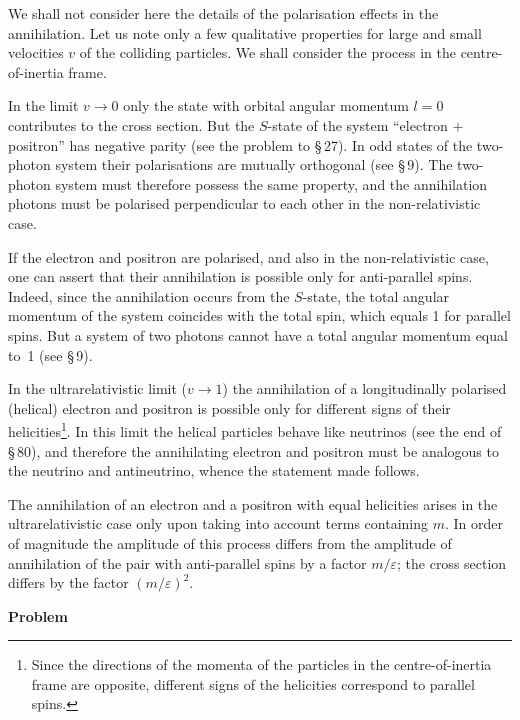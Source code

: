 We shall not consider here the details of the polarisation effects in the annihilation. Let us note only a few qualitative properties for large and small velocities $v$ of the colliding particles. We shall consider the process in the centre-of-inertia frame.

In the limit $v \to 0$ only the state with orbital angular momentum $l = 0$ contributes to the cross section. But the $S$-state of the system ``electron $+$ positron'' has negative parity (see the problem to \S\,27). In odd states of the two-photon system their polarisations are mutually orthogonal (see \S\,9). The two-photon system must therefore possess the same property, and the annihilation photons must be polarised perpendicular to each other in the non-relativistic case.

If the electron and positron are polarised, and also in the non-relativistic case, one can assert that their annihilation is possible only for anti-parallel spins. Indeed, since the annihilation occurs from the $S$-state, the total angular momentum of the system coincides with the total spin, which equals 1 for parallel spins. But a system of two photons cannot have a total angular momentum equal to~1 (see \S\,9).

In the ultrarelativistic limit ($v \to 1$) the annihilation of a longitudinally polarised (helical) electron and positron is possible only for different signs of their helicities\footnote{Since the directions of the momenta of the particles in the centre-of-inertia frame are opposite, different signs of the helicities correspond to parallel spins.}. In this limit the helical particles behave like neutrinos (see the end of \S\,80), and therefore the annihilating electron and positron must be analogous to the neutrino and antineutrino, whence the statement made follows.


The annihilation of an electron and a positron with equal helicities arises in the ultrarelativistic case only upon taking into account terms containing $m$. In order of magnitude the amplitude of this process differs from the amplitude of annihilation of the pair with anti-parallel spins by a factor $m/\varepsilon$; the cross section differs by the factor $(m/\varepsilon)^2$.

\bigskip

\begin{flushleft}\textbf{Problem}\end{flushleft}

